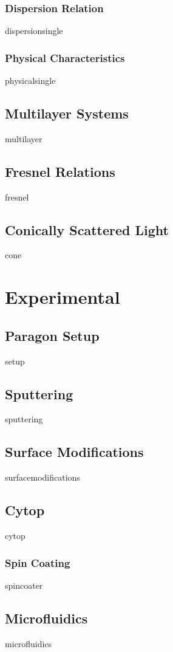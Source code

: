 \documentclass[a4paper,titlepage,onecolumn]{report}
\begin{document}
  \subsection{Dispersion Relation}
  {dispersionsingle}
  \subsection{Physical Characteristics}
  {physicalsingle}
 \section{Multilayer Systems}
 {multilayer}
 \section{Fresnel Relations}
 {fresnel}
 \section{Conically Scattered Light}\label{sec:coneexist}
 {cone}

\chapter{Experimental} \label{ch:experimental}
 \section{Paragon Setup}
 {setup}
 \section{Sputtering}
 {sputtering}
 \section{Surface Modifications}
  {surfacemodifications}
 \section{Cytop}
 {cytop}
  \subsection{Spin Coating}
  {spincoater}
 \section{Microfluidics}
 {microfluidics}
\end{document}
